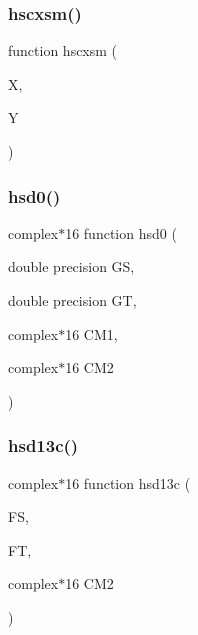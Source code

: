 \mbox{\label{djangoh__h_8f_a29a47e021209c36a2cbad8581294922e}} 
\subsubsection{\texorpdfstring{hscxsm()}{hscxsm()}}
{\footnotesize\ttfamily function hscxsm (\begin{DoxyParamCaption}\item[{}]{X,  }\item[{}]{Y }\end{DoxyParamCaption})}

\mbox{\label{djangoh__h_8f_a41bd52092a8cc07e147442227603457f}} 
\subsubsection{\texorpdfstring{hsd0()}{hsd0()}}
{\footnotesize\ttfamily complex$\ast$16 function hsd0 (\begin{DoxyParamCaption}\item[{double precision}]{GS,  }\item[{double precision}]{GT,  }\item[{complex$\ast$16}]{C\+M1,  }\item[{complex$\ast$16}]{C\+M2 }\end{DoxyParamCaption})}

\mbox{\label{djangoh__h_8f_aa0bae3f3986d41ccddbbe729945c2b3d}} 
\subsubsection{\texorpdfstring{hsd13c()}{hsd13c()}}
{\footnotesize\ttfamily complex$\ast$16 function hsd13c (\begin{DoxyParamCaption}\item[{}]{FS,  }\item[{}]{FT,  }\item[{complex$\ast$16}]{C\+M2 }\end{DoxyParamCaption})}

